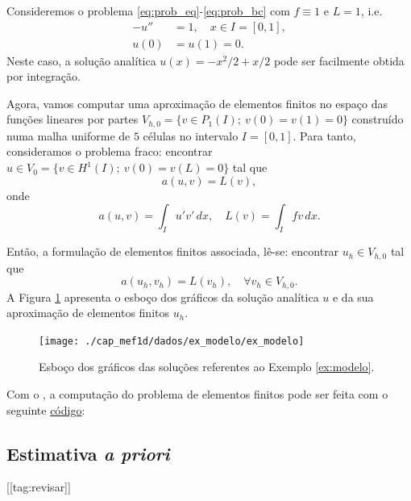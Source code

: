 \begin{ex}\label{ex:modelo}
  Consideremos o problema \eqref{eq:prob_eq}-\eqref{eq:prob_bc} com $f\equiv 1$ e $L=1$, i.e.
  \begin{align}
    -u'' &= 1,\quad x\in I=[0,1],\label{eq:ex_modelo_eq}\\
    u(0) &= u(1) = 0.\label{eq:ex_modelo_bc}
  \end{align}
Neste caso, a solução analítica $u(x) = -x^2/2+x/2$ pode ser facilmente obtida por integração.

Agora, vamos computar uma aproximação de elementos finitos no espaço das funções lineares por partes $V_{h,0} = \{v\in P_1(I);~v(0)=v(1)=0\}$ construído numa malha uniforme de $5$ células no intervalo $I=[0, 1]$. Para tanto, consideramos o problema fraco: encontrar $u\in V_0 = \{v\in H^1(I);~v(0)=v(L)=0\}$ tal que
\begin{equation}
  a(u, v) = L(v),
\end{equation}
onde
\begin{equation}
  a(u, v) = \int_I u'v'\,dx,\quad L(v)=\int_I fv\,dx.
\end{equation}

Então, a formulação de elementos finitos associada, lê-se: encontrar $u_h\in V_{h,0}$ tal que
\begin{equation}
  a(u_h, v_h) = L(v_h),\quad\forall v_h\in V_{h,0}.
\end{equation}
A Figura \ref{fig:ex_modelo} apresenta o esboço dos gráficos da solução analítica $u$ e da sua aproximação de elementos finitos $u_h$.

\begin{figure}[h!]
  \centering
  \texttt{[image: ./cap\_mef1d/dados/ex\_modelo/ex\_modelo]}
  \caption{Esboço dos gráficos das soluções referentes ao Exemplo \ref{ex:modelo}.}
  \label{fig:ex_modelo}
\end{figure}

\ifispython
Com o \fenics, a computação do problema de elementos finitos pode ser feita com o seguinte \href{https://github.com/phkonzen/notas/blob/master/src/MetodoElementosFinitos/cap_mef1d/dados/ex_modelo/ex_modelo.py}{código}:

\fi
\end{ex}

\subsection{Estimativa {\it a priori}}
[[tag:revisar]]

